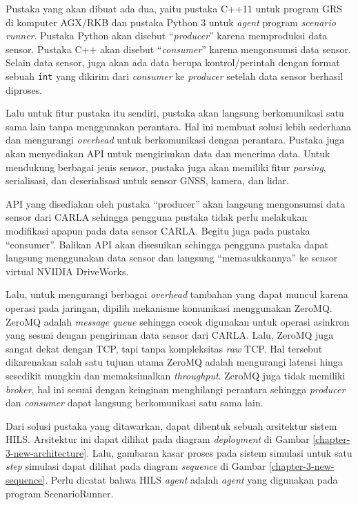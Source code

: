 Pustaka yang akan dibuat ada dua, yaitu pustaka C++11 untuk program GRS di
komputer AGX/RKB dan pustaka Python 3 untuk \textit{agent} program
\textit{scenario runner}. Pustaka Python akan disebut ``\textit{producer}''
karena memproduksi data sensor. Pustaka C++ akan disebut ``\textit{consumer}''
karena mengonsumsi data sensor. Selain data sensor, juga akan ada data berupa
kontrol/perintah dengan format sebuah \texttt{int} yang dikirim dari
\textit{consumer} ke \textit{producer} setelah data sensor berhasil diproses.

Lalu untuk fitur pustaka itu sendiri, pustaka akan langsung berkomunikasi satu
sama lain tanpa menggunakan perantara. Hal ini membuat solusi lebih sederhana
dan mengurangi \textit{overhead} untuk berkomunikasi dengan perantara. Pustaka
juga akan menyediakan API untuk mengirimkan data dan menerima data. Untuk
mendukung berbagai jenis sensor, pustaka juga akan memiliki fitur
\textit{parsing}, serialisasi, dan deserialisasi untuk sensor GNSS, kamera, dan
lidar.

API yang disediakan oleh pustaka ``producer'' akan langsung mengonsumsi data
sensor dari CARLA sehingga pengguna pustaka tidak perlu melakukan modifikasi
apapun pada data sensor CARLA. Begitu juga pada pustaka ``consumer''. Balikan
API akan disesuikan sehingga pengguna pustaka dapat langsung menggunakan data
sensor dan langsung ``memasukkannya'' ke sensor virtual NVIDIA DriveWorks.

Lalu, untuk mengurangi berbagai \textit{overhead} tambahan yang dapat muncul
karena operasi pada jaringan, dipilih mekanisme komunikasi menggunakan ZeroMQ.
ZeroMQ adalah \textit{message queue} sehingga cocok digunakan untuk operasi
asinkron yang sesuai dengan pengiriman data sensor dari CARLA. Lalu, ZeroMQ juga
sangat dekat dengan TCP, tapi tanpa kompleksitas \textit{raw} TCP. Hal tersebut
dikarenakan salah satu tujuan utama ZeroMQ adalah mengurangi latensi hinga
sesedikit mungkin dan memaksimalkan \textit{throughput}. ZeroMQ juga tidak
memiliki \textit{broker}, hal ini sesuai dengan keinginan menghilangi perantara
sehingga \textit{producer} dan \textit{consumer} dapat langsung berkomunikasi
satu sama lain.

Dari solusi pustaka yang ditawarkan, dapat dibentuk sebuah arsitektur sistem
HILS. Arsitektur ini dapat dilihat pada diagram \textit{deployment} di Gambar
\ref{chapter-3-new-architecture}. Lalu, gambaran kasar proses pada sistem
simulasi untuk satu \textit{step} simulasi dapat dilihat pada diagram
\textit{sequence} di Gambar \ref{chapter-3-new-sequence}. Perlu dicatat bahwa
HILS \textit{agent} adalah \textit{agent} yang digunakan pada program
ScenarioRunner.

